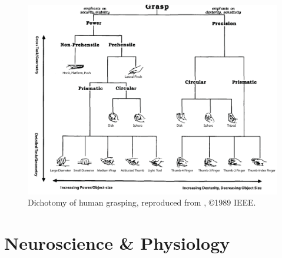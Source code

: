 \begin{landscape}
\begin{figure}
    \includegraphics[width=\linewidth]{images/grasp_dichotomy}
    \caption{Dichotomy of human grasping, reproduced from \cite{cutkosky1989grasp}, \copyright 1989 IEEE. }
    \label{fig:grasp_dichotomy}
\end{figure}
\end{landscape}

\section{Neuroscience \& Physiology}


